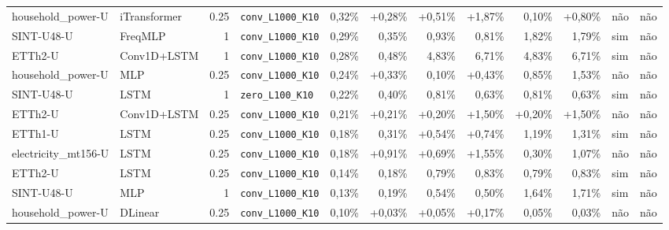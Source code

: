 \begin{longtable}{llrlrrrrrrll}
household\_power-U & iTransformer & 0.25 & \texttt{conv\_\allowbreak{}L1000\_\allowbreak{}K10} & \textminus{}0,32\% & +0,28\% & +0,51\% & +1,87\% & \textminus{}0,10\% & +0,80\% & n\~ao & n\~ao \\
SINT-U48-U & FreqMLP & 1 & \texttt{conv\_\allowbreak{}L1000\_\allowbreak{}K10} & \textminus{}0,29\% & \textminus{}0,35\% & \textminus{}0,93\% & \textminus{}0,81\% & \textminus{}1,82\% & \textminus{}1,79\% & sim & n\~ao \\
ETTh2-U & Conv1D+LSTM & 1 & \texttt{conv\_\allowbreak{}L1000\_\allowbreak{}K10} & \textminus{}0,28\% & \textminus{}0,48\% & \textminus{}4,83\% & \textminus{}6,71\% & \textminus{}4,83\% & \textminus{}6,71\% & sim & n\~ao \\
household\_power-U & MLP & 0.25 & \texttt{conv\_\allowbreak{}L1000\_\allowbreak{}K10} & \textminus{}0,24\% & +0,33\% & \textminus{}0,10\% & +0,43\% & \textminus{}0,85\% & \textminus{}1,53\% & n\~ao & n\~ao \\
SINT-U48-U & LSTM & 1 & \texttt{zero\_\allowbreak{}L100\_\allowbreak{}K10} & \textminus{}0,22\% & \textminus{}0,40\% & \textminus{}0,81\% & \textminus{}0,63\% & \textminus{}0,81\% & \textminus{}0,63\% & sim & n\~ao \\
ETTh2-U & Conv1D+LSTM & 0.25 & \texttt{conv\_\allowbreak{}L1000\_\allowbreak{}K10} & \textminus{}0,21\% & +0,21\% & +0,20\% & +1,50\% & +0,20\% & +1,50\% & n\~ao & n\~ao \\
ETTh1-U & LSTM & 0.25 & \texttt{conv\_\allowbreak{}L1000\_\allowbreak{}K10} & \textminus{}0,18\% & \textminus{}0,31\% & +0,54\% & +0,74\% & \textminus{}1,19\% & \textminus{}1,31\% & sim & n\~ao \\
electricity\_mt156-U & LSTM & 0.25 & \texttt{conv\_\allowbreak{}L1000\_\allowbreak{}K10} & \textminus{}0,18\% & +0,91\% & +0,69\% & +1,55\% & \textminus{}0,30\% & \textminus{}1,07\% & n\~ao & n\~ao \\
ETTh2-U & LSTM & 0.25 & \texttt{conv\_\allowbreak{}L1000\_\allowbreak{}K10} & \textminus{}0,14\% & \textminus{}0,18\% & \textminus{}0,79\% & \textminus{}0,83\% & \textminus{}0,79\% & \textminus{}0,83\% & sim & n\~ao \\
SINT-U48-U & MLP & 1 & \texttt{conv\_\allowbreak{}L1000\_\allowbreak{}K10} & \textminus{}0,13\% & \textminus{}0,19\% & \textminus{}0,54\% & \textminus{}0,50\% & \textminus{}1,64\% & \textminus{}1,71\% & sim & n\~ao \\
household\_power-U & DLinear & 0.25 & \texttt{conv\_\allowbreak{}L1000\_\allowbreak{}K10} & \textminus{}0,10\% & +0,03\% & +0,05\% & +0,17\% & \textminus{}0,05\% & \textminus{}0,03\% & n\~ao & n\~ao \\

\end{longtable}
